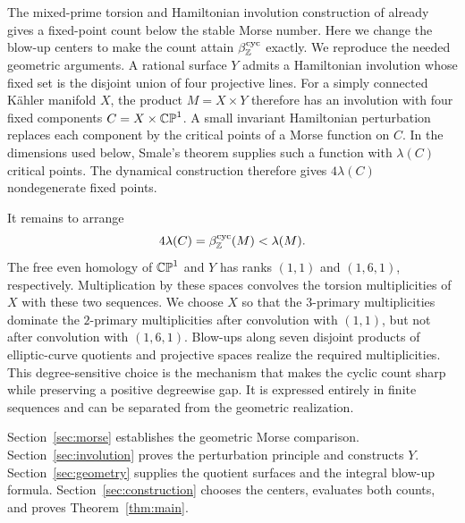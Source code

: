 The mixed-prime torsion and Hamiltonian involution construction of
\cite{OpenAI2026Stable} already gives a fixed-point count below the
stable Morse number. Here we change the blow-up centers to make the
count attain $\beta_{\mathbb Z}^{\mathrm{cyc}}$ exactly. We reproduce the
needed geometric arguments. A rational surface $Y$ admits a Hamiltonian
involution whose fixed set is the disjoint union of four projective
lines. For a simply connected K\"ahler manifold $X$, the product
$M=X\times Y$ therefore has an involution with four fixed
components $C=X\times\mathbb {CP}^1$. A small invariant Hamiltonian
perturbation replaces each component by the critical points of a
Morse function on $C$. In the dimensions used below, Smale's theorem
supplies such a function with $\lambda(C)$ critical points. The
dynamical construction therefore gives $4\lambda(C)$ nondegenerate
fixed points.

It remains to arrange
\[
 4\lambda(C)=\beta_{\mathbb Z}^{\mathrm{cyc}}(M)
 <\lambda(M).
\]
The free even homology of $\mathbb {CP}^1$ and $Y$ has ranks $(1,1)$ and
$(1,6,1)$, respectively. Multiplication by these spaces convolves
the torsion multiplicities of $X$ with these two sequences. We choose
$X$ so that the $3$-primary multiplicities dominate the $2$-primary
multiplicities after convolution with $(1,1)$, but not after
convolution with $(1,6,1)$. Blow-ups along seven disjoint products of
elliptic-curve quotients and projective spaces realize the required
multiplicities. This degree-sensitive choice is the mechanism that
makes the cyclic count sharp while preserving a positive degreewise
gap. It is expressed entirely in finite sequences and can be separated
from the geometric realization.

Section~\ref{sec:morse} establishes the geometric Morse comparison.
Section~\ref{sec:involution} proves the perturbation principle and
constructs $Y$. Section~\ref{sec:geometry} supplies the quotient
surfaces and the integral blow-up formula. Section~\ref{sec:construction}
chooses the centers, evaluates both counts, and proves
Theorem~\ref{thm:main}.
